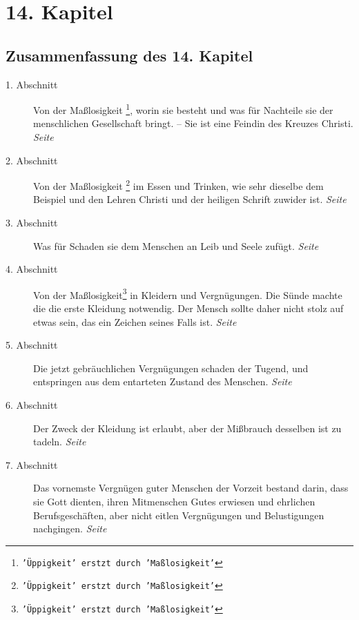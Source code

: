
\chapter{14. Kapitel} \label{kap14}

\section{Zusammenfassung des 14. Kapitel}

\begin{description}
\item[1. Abschnitt] Von der Maßlosigkeit
\footnote{\texttt{'Üppigkeit' erstzt durch 'Maßlosigkeit'}},
worin sie besteht und was für Nachteile
sie der menschlichen Gesellschaft bringt. -- Sie ist eine Feindin des Kreuzes
Christi.
\dotfill \textit{Seite~\pageref{kap14_ab1}}\\
\item[2. Abschnitt] Von der Maßlosigkeit
\footnote{\texttt{'Üppigkeit' erstzt durch 'Maßlosigkeit'}}
im Essen und Trinken, wie sehr dieselbe
dem Beispiel und den Lehren Christi und der heiligen Schrift zuwider ist.
\dotfill \textit{Seite~\pageref{kap14_ab2}}\\
\item[3. Abschnitt] Was für Schaden sie dem Menschen an Leib und Seele zufügt.
\dotfill \textit{Seite~\pageref{kap14_ab3}}\\
\item[4. Abschnitt] Von der Maßlosigkeit\footnote{\texttt{'Üppigkeit' erstzt durch 'Maßlosigkeit'}} in Kleidern und Vergnügungen. Die Sünde
machte die die erste Kleidung notwendig. Der Mensch sollte daher nicht stolz auf
etwas sein, das ein Zeichen seines Falls ist.
\dotfill \textit{Seite~\pageref{kap14_ab4}}\\
\item[5. Abschnitt] Die jetzt gebräuchlichen Vergnügungen schaden der Tugend, und
entspringen aus dem entarteten Zustand des Menschen.
\dotfill \textit{Seite~\pageref{kap14_ab5}}\\
\item[6. Abschnitt] Der Zweck der Kleidung ist erlaubt, aber der Mißbrauch
desselben ist zu tadeln.
\dotfill \textit{Seite~\pageref{kap14_ab6}}\\
\item[7. Abschnitt] Das vornemste Vergnügen guter Menschen der Vorzeit bestand
darin, dass sie Gott dienten, ihren Mitmenschen Gutes erwiesen und ehrlichen
Berufsgeschäften, aber nicht eitlen Vergnügungen und Belustigungen nachgingen.
\dotfill \textit{Seite~\pageref{kap14_ab7}}\\

\end{description}
